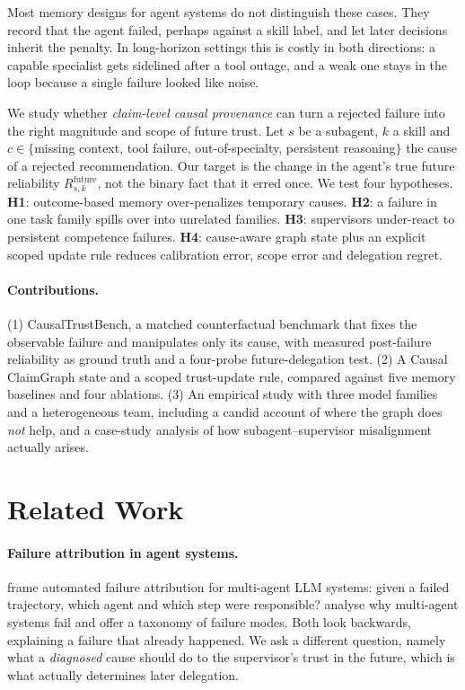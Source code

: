 \documentclass[letterpaper]{article}
\begin{document}
Most memory designs for agent systems do not distinguish these cases. They record that the agent failed, perhaps against a skill label, and let later decisions inherit the penalty. In long-horizon settings this is costly in both directions: a capable specialist gets sidelined after a tool outage, and a weak one stays in the loop because a single failure looked like noise.

We study whether \emph{claim-level causal provenance} can turn a rejected failure into the right magnitude and scope of future trust. Let $s$ be a subagent, $k$ a skill and $c\in\{$missing context, tool failure, out-of-specialty, persistent reasoning$\}$ the cause of a rejected recommendation. Our target is the change in the agent's true future reliability $R^{\text{future}}_{s,k}$, not the binary fact that it erred once. We test four hypotheses.
\textbf{H1}: outcome-based memory over-penalizes temporary causes.
\textbf{H2}: a failure in one task family spills over into unrelated families.
\textbf{H3}: supervisors under-react to persistent competence failures.
\textbf{H4}: cause-aware graph state plus an explicit scoped update rule reduces calibration error, scope error and delegation regret.

\paragraph{Contributions.}
(1) CausalTrustBench, a matched counterfactual benchmark that fixes the observable failure and manipulates only its cause, with measured post-failure reliability as ground truth and a four-probe future-delegation test.
(2) A Causal ClaimGraph state and a scoped trust-update rule, compared against five memory baselines and four ablations.
(3) An empirical study with three model families and a heterogeneous team, including a candid account of where the graph does \emph{not} help, and a case-study analysis of how subagent--supervisor misalignment actually arises.

\section{Related Work}
\paragraph{Failure attribution in agent systems.}
\citet{zhang2025which} frame automated failure attribution for multi-agent LLM systems: given a failed trajectory, which agent and which step were responsible? \citet{cemri2025why} analyse why multi-agent systems fail and offer a taxonomy of failure modes. Both look backwards, explaining a failure that already happened. We ask a different question, namely what a \emph{diagnosed} cause should do to the supervisor's trust in the future, which is what actually determines later delegation.
\end{document}
